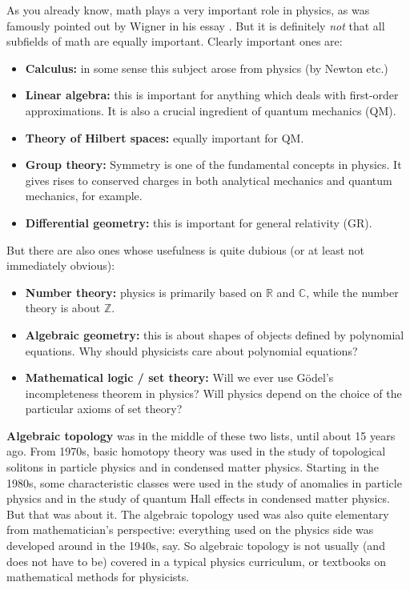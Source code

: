 \documentclass[12pt]{article}
\numberwithin{equation}{section}
\numberwithin{figure}{section}
\theoremstyle{remark}
\def\bC{\mathbb{C}}
\def\bR{\mathbb{R}}
\def\bZ{\mathbb{Z}}
\begin{document}
As you already know, math plays a very important role in physics, 
as was famously pointed out by Wigner in his essay \cite{WignerUnreasonable}.
But it is definitely \emph{not} that all subfields of math are equally important.
Clearly important ones are:
\begin{itemize}
  \item \textbf{Calculus:} in some sense this subject arose from physics (by Newton etc.)
  \item \textbf{Linear algebra:} this is important for anything which deals with first-order approximations. 
  It is also a crucial ingredient of quantum mechanics (QM).
  \item \textbf{Theory of Hilbert spaces:} equally important for QM.
  \item \textbf{Group theory:} Symmetry is one of the fundamental concepts in physics. It gives rises to conserved charges in both analytical mechanics and quantum mechanics, for example.
  \item \textbf{Differential geometry:} this is important for general relativity (GR).
\end{itemize}

But there are also ones whose usefulness is quite dubious (or at least not immediately obvious):
\begin{itemize}
  \item \textbf{Number theory:} physics is primarily based on $\bR$ and $\bC$, 
  while the number theory is about $\bZ$.
  \item \textbf{Algebraic geometry:} this is about shapes of objects defined by polynomial equations. 
  Why should physicists care about polynomial equations?
  \item \textbf{Mathematical logic / set theory:} Will we ever use G\"odel's incompleteness theorem in physics?
  Will physics depend on the choice of the particular axioms of set theory?
\end{itemize}

\textbf{Algebraic topology} was in the middle of these two lists, until about 15 years ago.
From 1970s, basic homotopy theory was used in the study of topological solitons 
in particle physics and in condensed matter physics.
Starting in the 1980s, 
some characteristic classes were used in the study of anomalies in particle physics
and in the study of quantum Hall effects in condensed matter physics.
But that was about it.
The algebraic topology used was also quite elementary from mathematician's perspective:
everything used on the physics side was developed around in the 1940s, say.
So  algebraic topology is not usually (and does not have to be) covered in a typical physics curriculum,
or textbooks on mathematical methods for physicists.
\end{document}
